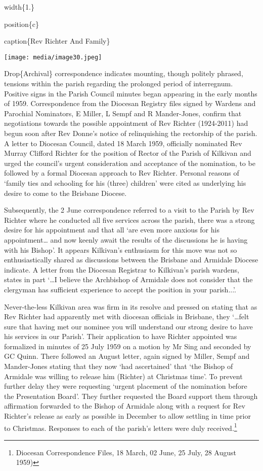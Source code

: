 width\{1.\}

position\{c\}

caption\{Rev Richter And Family\}

\texttt{[image: media/image30.jpeg]}

Drop\{Archival\} correspondence indicates mounting, though politely phrased, tensions within the parish regarding the prolonged period of interregnum. Positive signs in the Parish Council minutes began appearing in the early months of 1959. Correspondence from the Diocesan Registry files signed by Wardens and Parochial Nominators, E Miller, L Sempf and R Mander-Jones, confirm that negotiations towards the possible appointment of Rev Richter (1924-2011) had begun soon after Rev Donne's notice of relinquishing the rectorship of the parish. A letter to Diocesan Council, dated 18 March 1959, officially nominated Rev Murray Clifford Richter for the position of Rector of the Parish of Kilkivan and urged the council's urgent consideration and acceptance of the nomination, to be followed by a formal Diocesan approach to Rev Richter. Personal reasons of `family ties and schooling for his (three) children' were cited as underlying his desire to come to the Brisbane Diocese.

Subsequently, the 2 June correspondence referred to a visit to the Parish by Rev Richter where he conducted all five services across the parish, there was a strong desire for his appointment and that all `are even more anxious for his appointment\ldots{} and now keenly await the results of the discussions he is having with his Bishop'. It appears Kilkivan's enthusiasm for this move was not so enthusiastically shared as discussions between the Brisbane and Armidale Diocese indicate. A letter from the Diocesan Registrar to Kilkivan's parish wardens, states in part `\ldots I believe the Archbishop of Armidale does not consider that the clergyman has sufficient experience to accept the position in your parish...'.

Never-the-less Kilkivan area was firm in its resolve and pressed on stating that as Rev Richter had apparently met with diocesan officials in Brisbane, they `\ldots felt sure that having met our nominee you will understand our strong desire to have his services in our Parish'. Their application to have Richter appointed was formalized in minutes of 25 July 1959 on a motion by Mr Sing and seconded by GC Quinn. There followed an August letter, again signed by Miller, Sempf and Mander-Jones stating that they now `had ascertained' that `the Bishop of Armidale was willing to release him (Richter) at Christmas time'. To prevent further delay they were requesting `urgent placement of the nomination before the Presentation Board'. They further requested the Board support them through affirmation forwarded to the Bishop of Armidale along with a request for Rev Richter's release as early as possible in December to allow settling in time prior to Christmas. Responses to each of the parish's letters were duly received.\footnote{Diocesan Correspondence Files, 18 March, 02 June, 25 July, 28 August 1959)}

